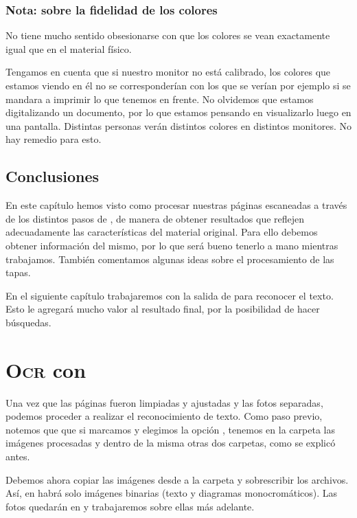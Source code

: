 \documentclass[%
	a5paper,
	10pt,
	twoside,
	openright,
	final,
]{memoir}
\begin{document}
	\subsection{Nota: sobre la fidelidad de los colores} No tiene mucho sentido obsesionarse con que los colores se vean exactamente igual que en el material físico.

	Tengamos en cuenta que si nuestro monitor no está calibrado, los colores que estamos viendo en él no se corresponderían con los que se verían por ejemplo si se mandara a imprimir lo que tenemos en frente. No olvidemos que estamos digitalizando un documento, por lo que estamos pensando en visualizarlo luego en una pantalla. Distintas personas verán distintos colores en distintos monitores. No hay remedio para esto.

	\section{Conclusiones} En este capítulo hemos visto como procesar nuestras páginas escaneadas a través de los distintos pasos de \scantailor, de manera de obtener resultados que reflejen adecuadamente las características del material original. Para ello debemos obtener información del mismo, por lo que será bueno tenerlo a mano mientras trabajamos. También comentamos algunas ideas sobre el procesamiento de las tapas.

	En el siguiente capítulo trabajaremos con la salida de \scantailor para reconocer el texto. Esto le agregará mucho valor al resultado final, por la posibilidad de hacer búsquedas.

	\chapter{\texorpdfstring{\textsc{Ocr}}{OCR} con \abby\label{sec:OCR}} Una vez que las páginas fueron limpiadas y ajustadas y las fotos separadas, podemos proceder a realizar el reconocimiento de texto. Como paso previo, notemos que que si marcamos  y elegimos la opción , tenemos en la carpeta  las imágenes procesadas y dentro de la misma otras dos carpetas, como se explicó antes.

	Debemos ahora copiar las imágenes desde  a la carpeta  y sobrescribir los archivos. Así, en  habrá solo imágenes binarias (texto y diagramas monocromáticos). Las fotos quedarán en  y trabajaremos sobre ellas más adelante.
\end{document}

